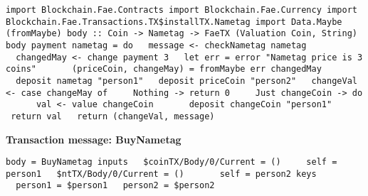 \documentclass[11pt]{article}
\newcommand{\codeblock}[1]{\begin{mdframed}[
    backgroundcolor=header-color,
    linecolor=header-color,
    innertopmargin=10pt,
    ]{\texttt{#1}}\end{mdframed}}
\begin{document}
\codeblock{import Blockchain.Fae.Contracts\newline
import Blockchain.Fae.Currency\newline
import Blockchain.Fae.Transactions.TX\$installTX.Nametag\newline
\newline
import Data.Maybe (fromMaybe)\newline
\newline
body :: Coin -\textgreater{} Nametag -\textgreater{} FaeTX (Valuation Coin, String)\newline
body payment nametag = do\newline
  message \textless{}- checkNametag nametag\newline
  changedMay \textless{}- change payment 3\newline
\newline
  let err = error "Nametag price is 3 coins"\newline
      (priceCoin, changeMay) = fromMaybe err changedMay\newline
\newline
  deposit nametag "person1"\newline
  deposit priceCoin "person2"\newline
\newline
  changeVal \textless{}- case changeMay of\newline
    Nothing -\textgreater{} return 0\newline
    Just changeCoin -\textgreater{} do\newline
      val \textless{}- value changeCoin\newline
      deposit changeCoin "person1"\newline
      return val\newline
\newline
  return (changeVal, message)}

\textbf{Transaction message: BuyNametag}

\codeblock{body = BuyNametag\newline
inputs\newline
  \$coinTX\slash{}Body\slash{}0\slash{}Current = ()\newline
    self = person1\newline
  \$ntTX\slash{}Body\slash{}0\slash{}Current = ()  \newline
    self = person2\newline
keys\newline
  person1 = \$person1\newline
  person2 = \$person2}
\end{document}

